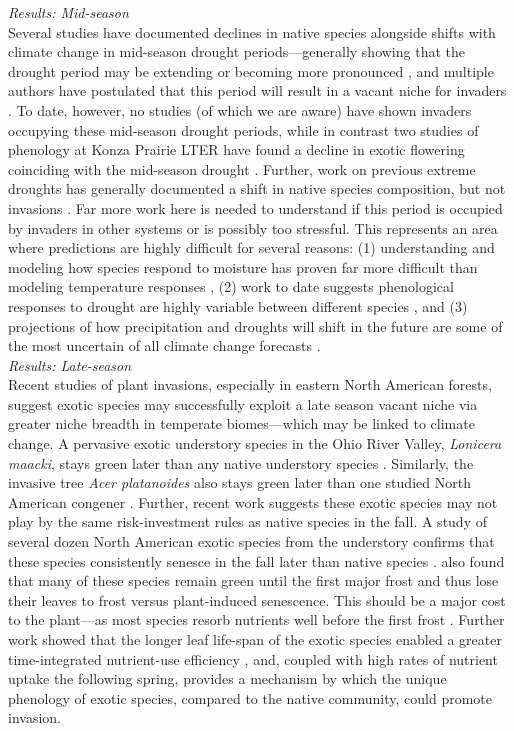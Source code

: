 \documentclass[11pt,a4paper,oneside]{article}
\begin{document}
\noindent \emph{Results: Mid-season}\\
\noindent  Several studies have documented declines in native species alongside shifts with climate change in mid-season drought periods---generally showing that the drought period may be extending or becoming more pronounced \citep{Aldridge:2011}, and multiple authors have postulated that this period will result in a vacant niche for invaders \citep{Sherry:2007fq,Aldridge:2011}. To date, however, no studies (of which we are aware) have shown invaders occupying these mid-season drought periods, while in contrast two studies of phenology at Konza Prairie LTER have found a decline in exotic flowering coinciding with the mid-season drought \citep{Craine:2012kl,wolkovichAmBot2013}. Further, work on previous extreme droughts has generally documented a shift in native species composition, but not invasions \citep{Weaver1936}. Far more work here is needed to understand if this period is occupied by invaders in other systems or is possibly too stressful. This represents an area where predictions are highly difficult for several reasons: (1) understanding and modeling how species respond to moisture has proven far more difficult than modeling temperature responses \citep{Crimmins:2011lq,wolkovichAmBot2013}, (2) work to date suggests phenological responses to drought are highly variable between different species \citep{Jentsch:2009ff,Prieto:2009fu}, and (3) projections of how precipitation and droughts will shift in the future are some of the most uncertain of all climate change forecasts \citep{knutti2013}.
\\

\noindent \emph{Results: Late-season}\\
\noindent Recent studies of plant invasions, especially in eastern North American forests, suggest exotic species may successfully exploit a late season vacant niche via greater niche breadth in temperate biomes---which may be linked to climate change. A pervasive exotic understory species in the Ohio River Valley, \emph{Lonicera maacki}, stays green later than any native understory species \citep{becker2013}. Similarly, the invasive tree \emph{Acer platanoides} also stays green later than one studied North American congener \citep{paquette2012}. Further, recent work suggests these exotic species may not play by the same risk-investment rules as native species in the fall. A study of several dozen North American exotic species from the understory confirms that these species consistently senesce in the fall later than native species \citep{Fridley:2012fj}. \citet{Fridley:2012fj} also found that many of these species remain green until the first major frost and thus lose their leaves to frost versus plant-induced senescence. This should be a major cost to the plant---as most species resorb nutrients well before the first frost \citep{Lambers:2008jb}. Further work showed that the longer leaf life-span of the exotic species enabled a greater time-integrated nutrient-use efficiency \citep{Heberling2013}, and, coupled with high rates of nutrient uptake the following spring, provides a mechanism by which the unique phenology of exotic species, compared to the native community, could promote invasion.
\end{document}
